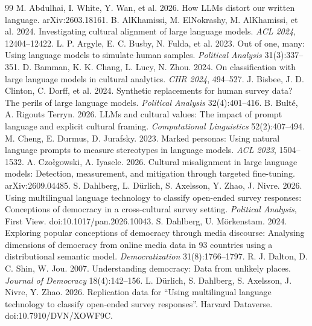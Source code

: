 \documentclass[10pt,twocolumn]{article}
\begin{document}
\small
\begin{thebibliography}{99}
 M. Abdulhai, I. White, Y. Wan, et al. 2026. How LLMs distort our written language. arXiv:2603.18161.
 B. AlKhamissi, M. ElNokrashy, M. AlKhamissi, et al. 2024. Investigating cultural alignment of large language models. \emph{ACL 2024}, 12404--12422.
 L. P. Argyle, E. C. Busby, N. Fulda, et al. 2023. Out of one, many: Using language models to simulate human samples. \emph{Political Analysis} 31(3):337--351.
 D. Bamman, K. K. Chang, L. Lucy, N. Zhou. 2024. On classification with large language models in cultural analytics. \emph{CHR 2024}, 494--527.
 J. Bisbee, J. D. Clinton, C. Dorff, et al. 2024. Synthetic replacements for human survey data? The perils of large language models. \emph{Political Analysis} 32(4):401--416.
 B. Bulté, A. Rigouts Terryn. 2026. LLMs and cultural values: The impact of prompt language and explicit cultural framing. \emph{Computational Linguistics} 52(2):407--494.
 M. Cheng, E. Durmus, D. Jurafsky. 2023. Marked personas: Using natural language prompts to measure stereotypes in language models. \emph{ACL 2023}, 1504--1532.
 A. Czołgowski, A. Iyasele. 2026. Cultural misalignment in large language models: Detection, measurement, and mitigation through targeted fine-tuning. arXiv:2609.04485.
 S. Dahlberg, L. Dürlich, S. Axelsson, Y. Zhao, J. Nivre. 2026. Using multilingual language technology to classify open-ended survey responses: Conceptions of democracy in a cross-cultural survey setting. \emph{Political Analysis}, First View. doi:10.1017/pan.2026.10043.
 S. Dahlberg, U. Mörkenstam. 2024. Exploring popular conceptions of democracy through media discourse: Analysing dimensions of democracy from online media data in 93 countries using a distributional semantic model. \emph{Democratization} 31(8):1766--1797.
 R. J. Dalton, D. C. Shin, W. Jou. 2007. Understanding democracy: Data from unlikely places. \emph{Journal of Democracy} 18(4):142--156.
 L. Dürlich, S. Dahlberg, S. Axelsson, J. Nivre, Y. Zhao. 2026. Replication data for ``Using multilingual language technology to classify open-ended survey responses''. Harvard Dataverse. doi:10.7910/DVN/XOWF9C.

\end{thebibliography}
\end{document}
